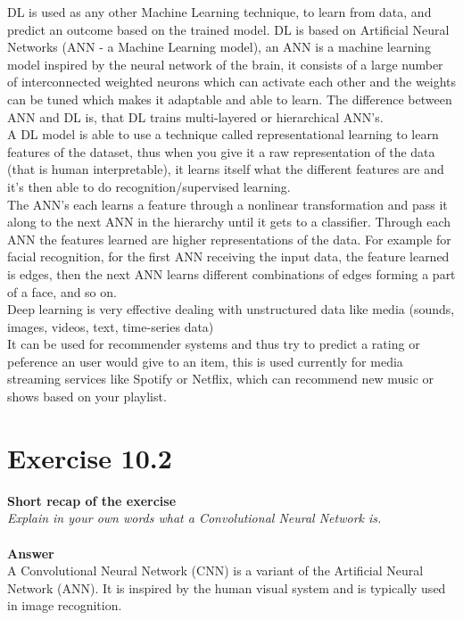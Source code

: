 \documentclass{article}
\begin{document}
DL is used as any other Machine Learning technique, to learn from data, and predict an outcome based on the trained model. DL is based on Artificial Neural Networks (ANN - a Machine Learning model), an ANN is a machine learning model inspired by the neural network of the brain, it consists of a large number of interconnected weighted neurons which can activate each other and the weights can be tuned which makes it adaptable and able to learn. The difference between ANN and DL is, that DL trains multi-layered or hierarchical ANN's.\\

A DL model is able to use a technique called representational learning to learn features of the dataset, thus when you give it a raw representation of the data (that is human interpretable), it learns itself what the different features are and it's then able to do recognition/supervised learning.\\

The ANN's each learns a feature through a nonlinear transformation and pass it along to the next ANN in the hierarchy until it gets to a classifier. Through each ANN the features learned are higher representations of the data. For example for facial recognition, for the first ANN receiving the input data, the feature learned is edges, then the next ANN learns different combinations of edges forming a part of a face, and so on.\\

Deep learning is very effective dealing with unstructured data like media (sounds, images, videos, text, time-series data)\\

It can be used for recommender systems and thus try to predict a rating or peference an user would give to an item, this is used currently for media streaming services like Spotify or Netflix, which can recommend new music or shows based on your playlist.\\

\section{Exercise 10.2}
\textbf{Short recap of the exercise}\\
\textit{Explain in your own words what a Convolutional Neural Network is.}\\
~\\
\textbf{Answer}\\
A Convolutional Neural Network (CNN) is a variant of the Artificial Neural Network (ANN). It is inspired by the human visual system and is typically used in image recognition.\\
\end{document}
